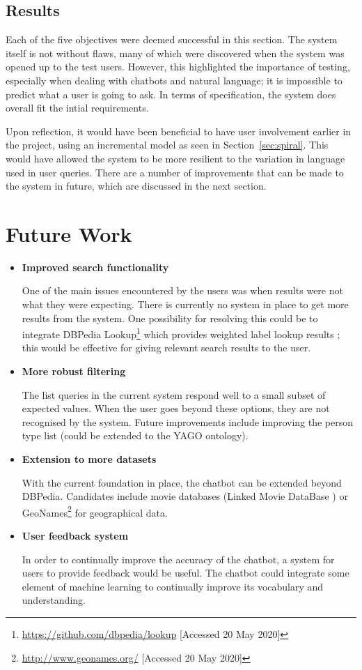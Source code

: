 \subsection{Results}
Each of the five objectives were deemed successful in this section. The system itself is not without flaws, many of which were discovered when the system was opened up to the test users. However, this highlighted the importance of testing, especially when dealing with chatbots and natural language; it is impossible to predict what a user is going to ask. In terms of specification, the system does overall fit the intial requirements.

Upon reflection, it would have been beneficial to have user involvement earlier in the project, using an incremental model as seen in Section~\ref{sec:spiral}. This would have allowed the system to be more resilient to the variation in language used in user queries. There are a number of improvements that can be made to the system in future, which are discussed in the next section.

\section{Future Work}
\label{sec:future}

\begin{itemize}
	\item \textbf{Improved search functionality}
		\par One of the main issues encountered by the users was when results were not what they were expecting. There is currently no system in place to get more results from the system. One possibility for resolving this could be to integrate DBPedia Lookup\footnote{\url{https://github.com/dbpedia/lookup} [Accessed 20 May 2020]} which provides weighted label lookup results \cite{bizer2009dbpedia}; this would be effective for giving relevant search results to the user.
	\item \textbf{More robust filtering}
		\par The list queries in the current system respond well to a small subset of expected values. When the user goes beyond these options, they are not recognised by the system. Future improvements include improving the person type list (could be extended to the YAGO ontology). 
	\item \textbf{Extension to more datasets}
		\par With the current foundation in place, the chatbot can be extended beyond DBPedia. Candidates include movie databases (Linked Movie DataBase \cite{linkedmdb}) or GeoNames\footnote{\url{http://www.geonames.org/} [Accessed 20 May 2020]} for geographical data.
	\item \textbf{User feedback system}
		\par In order to continually improve the accuracy of the chatbot, a system for users to provide feedback would be useful. The chatbot could integrate some element of machine learning to continually improve its vocabulary and understanding.
\end{itemize}

